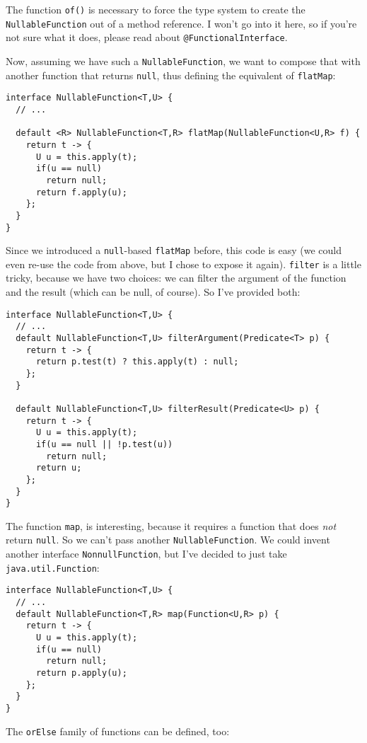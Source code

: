 \documentclass[11pt]{article}
\begin{document}
The function \texttt{of()} is necessary to force the type system to create the \texttt{NullableFunction} out of a method reference. I won't go into it here, so if you're not sure what it does, please read about \texttt{@FunctionalInterface}.

Now, assuming we have such a \texttt{NullableFunction}, we want to compose that with another function that returns \texttt{null}, thus defining the equivalent of \texttt{flatMap}:

\begin{verbatim}
interface NullableFunction<T,U> {
  // ...

  default <R> NullableFunction<T,R> flatMap(NullableFunction<U,R> f) {
    return t -> {
      U u = this.apply(t);
      if(u == null)
        return null;
      return f.apply(u);
    };
  }
}
\end{verbatim}

Since we introduced a \texttt{null}-based \texttt{flatMap} before, this code is easy (we could even re-use the code from above, but I chose to expose it again). \texttt{filter} is a little tricky, because we have two choices: we can filter the argument of the function and the result (which can be null, of course). So I've provided both:

\begin{verbatim}
interface NullableFunction<T,U> {
  // ...
  default NullableFunction<T,U> filterArgument(Predicate<T> p) {
    return t -> {
      return p.test(t) ? this.apply(t) : null;
    };
  }

  default NullableFunction<T,U> filterResult(Predicate<U> p) {
    return t -> {
      U u = this.apply(t);
      if(u == null || !p.test(u))
        return null;
      return u;
    };
  }
}
\end{verbatim}

The function \texttt{map}, is interesting, because it requires a function that does \emph{not} return \texttt{null}. So we can't pass another \texttt{NullableFunction}. We could invent another interface \texttt{NonnullFunction}, but I've decided to just take \texttt{java.util.Function}:

\begin{verbatim}
interface NullableFunction<T,U> {
  // ...
  default NullableFunction<T,R> map(Function<U,R> p) {
    return t -> {
      U u = this.apply(t);
      if(u == null)
        return null;
      return p.apply(u);
    };
  }
}
\end{verbatim}

The \texttt{orElse} family of functions can be defined, too:
\end{document}
